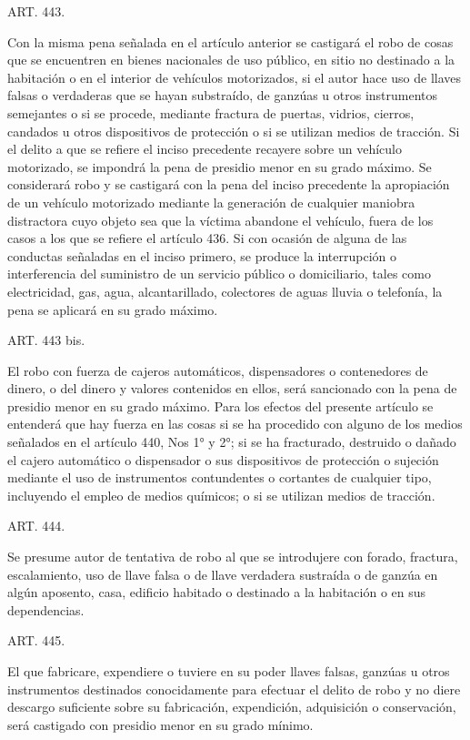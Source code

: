    
    ART. 443.

    Con la misma pena señalada en el artículo anterior se castigará el robo de cosas que se encuentren en bienes nacionales de uso público, en sitio no destinado a la habitación o en el interior de vehículos motorizados, si el autor hace uso de llaves falsas o verdaderas que se hayan substraído, de ganzúas u otros instrumentos semejantes o si se procede, mediante fractura de puertas, vidrios, cierros, candados u otros dispositivos de protección o si se utilizan medios de tracción.
    Si el delito a que se refiere el inciso precedente recayere sobre un vehículo motorizado, se impondrá la pena de presidio menor en su grado máximo.
    Se considerará robo y se castigará con la pena del inciso precedente la apropiación de un vehículo motorizado mediante la generación de cualquier maniobra distractora cuyo objeto sea que la víctima abandone el vehículo, fuera de los casos a los que se refiere el artículo 436.
    Si con ocasión de alguna de las conductas señaladas en el inciso primero, se produce la interrupción o interferencia del suministro de un servicio público o domiciliario, tales como electricidad, gas, agua, alcantarillado, colectores de aguas lluvia o telefonía, la pena se aplicará en su grado máximo.


    ART. 443 bis.

    El robo con fuerza de cajeros automáticos, dispensadores o contenedores de dinero, o del dinero y valores contenidos en ellos, será sancionado con la pena de presidio menor en su grado máximo. Para los efectos del presente artículo se entenderá que hay fuerza en las cosas si se ha procedido con alguno de los medios señalados en el artículo 440, Nos 1° y 2°; si se ha fracturado, destruido o dañado el cajero automático o dispensador o sus dispositivos de protección o sujeción mediante el uso de instrumentos contundentes o cortantes de cualquier tipo, incluyendo el empleo de medios químicos; o si se utilizan medios de tracción.

    ART. 444.

    Se presume autor de tentativa de robo al que se introdujere con forado, fractura, escalamiento, uso de llave falsa o de llave verdadera sustraída o de ganzúa en algún aposento, casa, edificio habitado o destinado a la habitación o en sus dependencias.


    ART. 445.

    El que fabricare, expendiere o tuviere en su poder llaves falsas, ganzúas u otros instrumentos destinados conocidamente para efectuar el delito de robo y no diere descargo suficiente sobre su fabricación, expendición, adquisición o conservación, será castigado con presidio menor en su grado mínimo.


